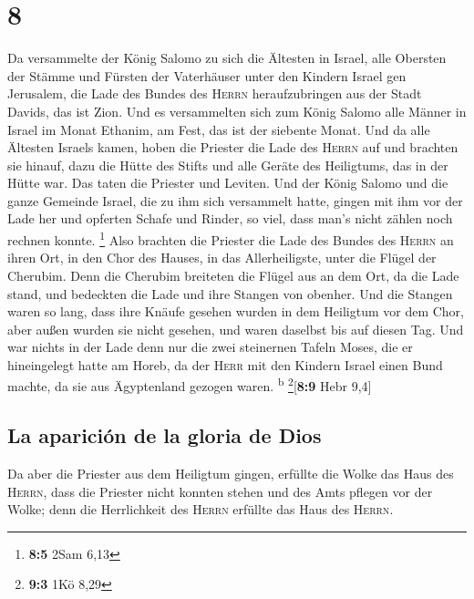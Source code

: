 \hypertarget{section-7}{%
\section{8}\label{section-7}}

 Da versammelte der König Salomo zu sich die Ältesten in
Israel, alle Obersten der Stämme und Fürsten der Vaterhäuser unter den
Kindern Israel gen Jerusalem, die Lade des Bundes des \textsc{Herrn}
heraufzubringen aus der Stadt Davids, das ist Zion.  Und
es versammelten sich zum König Salomo alle Männer in Israel im Monat
Ethanim, am Fest, das ist der siebente Monat.  Und da alle
Ältesten Israels kamen, hoben die Priester die Lade des \textsc{Herrn}
auf  und brachten sie hinauf, dazu die Hütte des Stifts
und alle Geräte des Heiligtums, das in der Hütte war. Das taten die
Priester und Leviten.  Und der König Salomo und die ganze
Gemeinde Israel, die zu ihm sich versammelt hatte, gingen mit ihm vor
der Lade her und opferten Schafe und Rinder, so viel, dass man's nicht
zählen noch rechnen konnte. \footnote{\textbf{8:5} 2Sam 6,13}
 Also brachten die Priester die Lade des Bundes des
\textsc{Herrn} an ihren Ort, in den Chor des Hauses, in das
Allerheiligste, unter die Flügel der Cherubim.  Denn die
Cherubim breiteten die Flügel aus an dem Ort, da die Lade stand, und
bedeckten die Lade und ihre Stangen von obenher.  Und die
Stangen waren so lang, dass ihre Knäufe gesehen wurden in dem Heiligtum
vor dem Chor, aber außen wurden sie nicht gesehen, und waren daselbst
bis auf diesen Tag.  Und war nichts in der Lade denn nur
die zwei steinernen Tafeln Moses, die er hineingelegt hatte am Horeb, da
der \textsc{Herr} mit den Kindern Israel einen Bund machte, da sie aus
Ägyptenland gezogen waren. \textsuperscript{b}
\footnote{\textbf{9:3} 1Kö 8,29}{[}\textbf{8:9} Hebr 9,4{]}

\hypertarget{la-apariciuxf3n-de-la-gloria-de-dios}{%
\subsection{La aparición de la gloria de
Dios}\label{la-apariciuxf3n-de-la-gloria-de-dios}}

 Da aber die Priester aus dem Heiligtum gingen, erfüllte
die Wolke das Haus des \textsc{Herrn},  dass die Priester
nicht konnten stehen und des Amts pflegen vor der Wolke; denn die
Herrlichkeit des \textsc{Herrn} erfüllte das Haus des \textsc{Herrn}.

